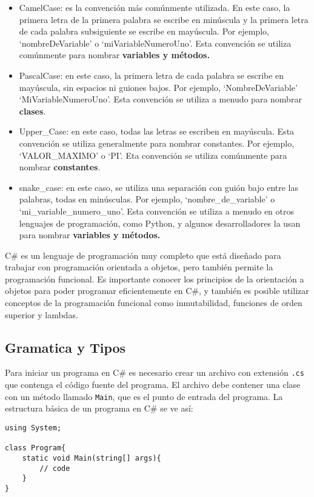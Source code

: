 \documentclass[executivepaper]{article}
\begin{document}
\begin{itemize}
    \item CamelCase: es la convención más comúnmente utilizada. En este caso, la primera letra de la primera palabra se escribe en minúscula y la primera letra de cada palabra subsiguiente se escribe en mayúscula. Por ejemplo, \enquote*{nombreDeVariable} o \enquote*{miVariableNumeroUno}. Esta convención se utiliza comúnmente para nombrar \textbf{variables y métodos.}
    \item PascalCase: en este caso, la primera letra de cada palabra se escribe en mayúscula, sin espacios ni guiones bajos. Por ejemplo, \enquote*{NombreDeVariable} \enquote*{MiVariableNumeroUno}. Esta convención se utiliza a menudo para nombrar \textbf{clases}.
    \item Upper\_Case: en este caso, todas las letras se escriben en mayúscula. Esta convención se utiliza generalmente para nombrar constantes. Por ejemplo, \enquote*{VALOR\_MAXIMO} o \enquote*{PI}. Eta convención se utiliza comúnmente para nombrar \textbf{constantes}.
    \item snake\_case: en este caso, se utiliza una separación con guión bajo entre las palabras, todas en minúsculas. Por ejemplo, \enquote*{nombre\_de\_variable} o \enquote*{mi\_variable\_numero\_uno}. Esta convención se utiliza a menudo en otros lenguajes de programación, como Python, y algunos desarrolladores la usan para nombrar \textbf{variables y métodos.}
\end{itemize}

C\# es un lenguaje de programación muy completo que está diseñado para trabajar con programación orientada a objetos, pero también permite la programación funcional. Es importante conocer los principios de la orientación a objetos para poder programar eficientemente en C\#, y también es posible utilizar conceptos de la programación funcional como inmutabilidad, funciones de orden superior y lambdas.

\subsection{Gramatica y Tipos}

Para iniciar un programa en C\# es necesario crear un archivo con extensión \verb|.cs| que contenga el código fuente del programa. El archivo debe contener una clase con un método llamado \verb|Main|, que es el punto de entrada del programa. La estructura básica de un programa en C\# se ve así:

\begin{lstlisting}
using System;

class Program{
    static void Main(string[] args){
        // code
    }
}
\end{lstlisting}
\end{document}
